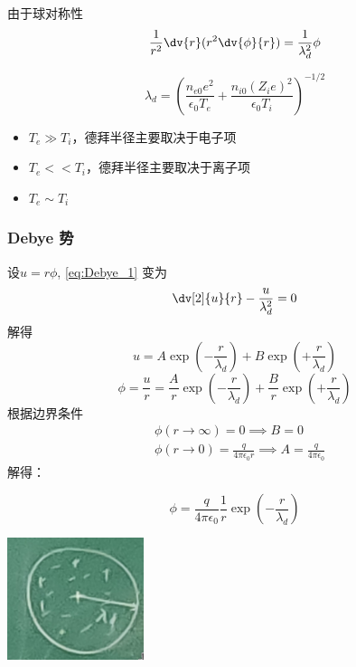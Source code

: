 由于球对称性
\begin{equation}
  \frac{1}{r^2} \dv{r}(r^2 \dv{\phi}{r}) = \frac{1}{\lambda_d^2}\phi
  \label{eq:Debye_1}
\end{equation}
\begin{definition}[德拜半径]
  \begin{equation}
  \lambda_d = \left( \frac{n_{e0} e^2}{\epsilon_0 T_e}  + \frac{n_{i0}  (Z_i e)^2}{\epsilon_0 T_i}\right)^{- 1 / 2}
  \end{equation}
\end{definition}

\begin{remark}
  \begin{itemize}
    \item \(T_e  \gg  T_i\)，德拜半径主要取决于电子项
    \item \(T_e  <<  T_i\)，德拜半径主要取决于离子项
    \item \(T_e  \sim  T_i\)
  \end{itemize}
\end{remark}

\subsubsection{Debye 势}
设\(u = r \phi\), \cref{eq:Debye_1} 变为
\begin{equation}
 \dv[2]{u}{r}  - \frac{u}{\lambda_d^2} = 0
\end{equation}
解得
\begin{equation}
u = 
A \exp( - \frac{r}{\lambda_d} )
+B \exp( + \frac{r}{\lambda_d} )
\end{equation}
\begin{equation}
\phi = \frac{u}{r} =
\frac{A}{r} \exp( - \frac{r}{\lambda_d} )
+\frac{B}{r} \exp( + \frac{r}{\lambda_d} )
\end{equation}
根据边界条件
\begin{align}
  & \phi(r \to \infty) = 0 \implies B=0 \\
  & \phi(r \to 0) = \frac{q}{4 \pi \epsilon_0 r} \implies A = \frac{q}{4\pi \epsilon_0}
\end{align}
解得：
\begin{definition}
\begin{equation}
 \phi = \frac{q}{4 \pi \epsilon_0}  \frac{1}{r} \exp(- \frac{r}{\lambda_d})
\end{equation} 
\end{definition}
\includegraphics[width=0.3\textwidth]{figures/2022-09-09T230435+0800.png}

